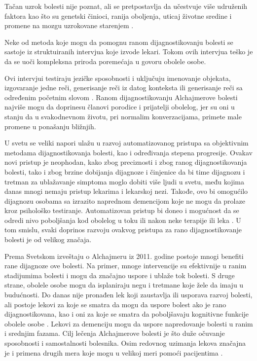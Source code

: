 \documentclass[12pt,oneside]{memoir}
\begin{document}
Tačan uzrok bolesti nije poznat, ali se pretpostavlja da učestvuje više udruženih faktora kao što su genetski činioci, ranija oboljenja, uticaj životne sredine i promene na mozgu uzrokovane starenjem \cite{medicor}.

Neke od metoda koje mogu da pomognu ranom dijagnostikovanju bolesti se sastoje iz struktuiranih intervjua koje izvode lekari. Tokom ovih intervjua teško je da se uoči kompleksna priroda poremećaja u govoru obolele osobe.

Ovi intervjui testiraju jezičke sposobnosti i uključuju imenovanje objekata, izgovaranje jedne reči, generisanje reči iz datog konteksta ili generisanje reči sa određenim početnim slovom \cite{automaticdetandrat}. Ranom dijagnostikovanju Alchajmerove bolesti najviše mogu da doprinesu članovi porodice i prijatelji obolelog, jer su oni u stanju da u svakodnevnom životu, pri normalim konverzacijama, primete male promene u ponašanju bližnjih.

U svetu se veliki napori ulažu u razvoj automatizovanog pristupa sa objektivnim metodama dijagnostikovanja bolesti, kao i određivanja stepena progresije\cite{linmark}. Ovakav novi pristup je neophodan, kako zbog preciznosti i zbog ranog dijagnostikovanja bolesti, tako i zbog brzine dobijanja dijagnoze i činjenice da bi time dijagnozu i tretman za ublažavanje simptoma moglo dobiti više ljudi u svetu, među kojima danas mnogi nemaju pristup lekarima i lekarskoj nezi. Takođe, ovo bi omogućilo dijagnozu osobama sa izrazito naprednom demencijom koje ne mogu da prolaze kroz psihološko testiranje. Automatizovan pristup bi doneo i mogućnost da se odredi nivo poboljšanja kod obolelog u toku ili nakon neke terapije ili leka \cite{Evaloftechfolexicalperformance}. U tom smislu, svaki doprinos razvoju ovakvog pristupa za rano dijagnostikovanje bolesti je od velikog značaja. 

Prema Svetskom izveštaju o Alchajmeru iz 2011. godine postoje mnogi benefiti rane dijagnoze ove bolesti. Na primer, mnoge intervencije su efektivnije u ranim stadijumima bolesti i mogu da značajno uspore i ublaže tok bolesti. S druge strane, obolele osobe mogu da isplaniraju negu i tretmane koje žele da imaju u budućnosti. Do danas nije pronađen lek koji zaustavlja ili usporava razvoj bolesti, ali postoje lekovi za koje se smatra da mogu da uspore bolest ako je rano dijagnostikovana, kao i oni za koje se smatra da poboljšavaju kognitivne funkcije obolele osobe \cite{Alzheimerfactsfigures}. Lekovi za demenciju mogu da uspore napredovanje bolesti u ranim i srednjim fazama.  Cilj lečenja Alchajmerove bolesti je što duže očuvanje sposobnosti i samostalnosti bolesnika. Osim redovnog uzimanja lekova značajna je i primena drugih mera koje mogu u velikoj meri pomoći pacijentima \cite{medicor}.
\end{document}
